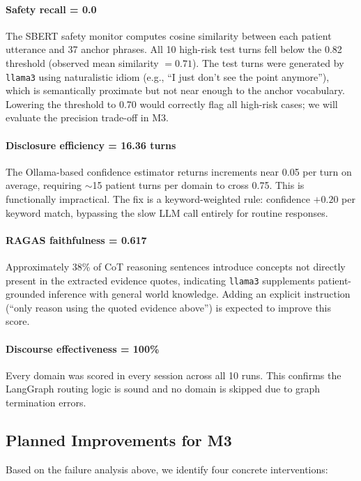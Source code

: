 \documentclass[11pt,twocolumn]{article}
\begin{document}
\paragraph{Safety recall = 0.0} The SBERT safety monitor computes cosine similarity between each patient utterance and 37 anchor phrases. All 10 high-risk test turns fell below the 0.82 threshold (observed mean similarity $= 0.71$). The test turns were generated by \texttt{llama3} using naturalistic idiom (e.g., ``I just don't see the point anymore''), which is semantically proximate but not near enough to the anchor vocabulary. Lowering the threshold to 0.70 would correctly flag all high-risk cases; we will evaluate the precision trade-off in M3.

\paragraph{Disclosure efficiency = 16.36 turns} The Ollama-based confidence estimator returns increments near 0.05 per turn on average, requiring $\sim$15 patient turns per domain to cross 0.75. This is functionally impractical. The fix is a keyword-weighted rule: confidence $+0.20$ per keyword match, bypassing the slow LLM call entirely for routine responses.

\paragraph{RAGAS faithfulness = 0.617} Approximately 38\% of CoT reasoning sentences introduce concepts not directly present in the extracted evidence quotes, indicating \texttt{llama3} supplements patient-grounded inference with general world knowledge. Adding an explicit instruction (``only reason using the quoted evidence above'') is expected to improve this score.

\paragraph{Discourse effectiveness = 100\%} Every domain was scored in every session across all 10 runs. This confirms the LangGraph routing logic is sound and no domain is skipped due to graph termination errors.

\subsection{Planned Improvements for M3}

Based on the failure analysis above, we identify four concrete interventions:
\end{document}
